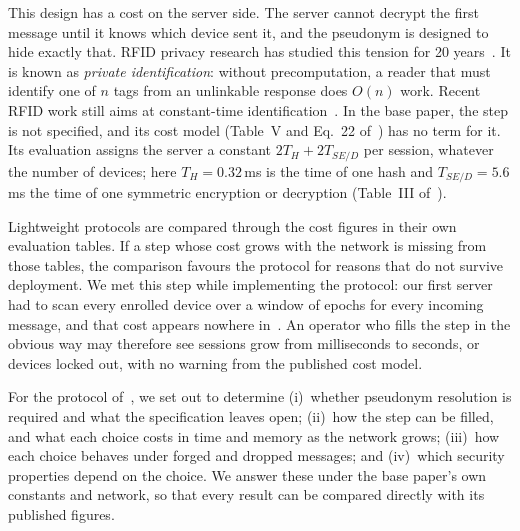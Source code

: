 This design has a cost on the server side. The server cannot decrypt the first message until it knows which device sent
it, and the pseudonym is designed to hide exactly that. RFID privacy research has studied this tension for 20
years~\cite{weis,ohkubo,molnar,avoine05,ado05,tsudik}. It is known as \emph{private identification}: without
precomputation, a reader that must identify one of $n$ tags from an unlinkable response does $O(n)$ work. Recent RFID
work still aims at constant-time identification~\cite{tiplea}. In the base paper, the step is not specified, and its cost
model (Table~V and Eq.~22 of~\cite{base}) has no term for it. Its evaluation assigns the server a constant
$2T_H+2T_{SE/D}$ per session, whatever the number of devices; here $T_H=0.32$\,ms is the time of one hash and
$T_{SE/D}=5.6$\,ms the time of one symmetric encryption or decryption (Table~III of~\cite{base}).

 Lightweight protocols are compared through the cost figures in their own evaluation tables. If a
step whose cost grows with the network is missing from those tables, the comparison favours the protocol for reasons that
do not survive deployment. We met this step while implementing the protocol: our first server had to scan every enrolled
device over a window of epochs for every incoming message, and that cost appears nowhere in~\cite{base}. An operator who
fills the step in the obvious way may therefore see sessions grow from milliseconds to seconds, or devices locked out,
with no warning from the published cost model.

 For the protocol of~\cite{base}, we set out to determine (i)~whether pseudonym resolution is required
and what the specification leaves open; (ii)~how the step can be filled, and what each choice costs in time and memory
as the network grows; (iii)~how each choice behaves under forged and dropped messages\iffv; and (iv)~which security
properties depend on the choice\fi. We answer these under the base paper's own constants and network, so that every result
can be compared directly with its published figures.

